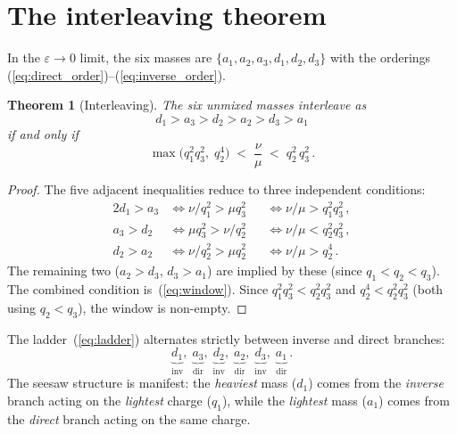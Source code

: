 \documentclass[preprint,12pt]{elsarticle}
\newtheorem{theorem}{Theorem}
\begin{document}
\section{The interleaving theorem}
\label{sec:interleaving}

In the $\varepsilon \to 0$ limit, the six masses are
$\{a_1, a_2, a_3, d_1, d_2, d_3\}$ with the orderings
(\ref{eq:direct_order})--(\ref{eq:inverse_order}).

\begin{theorem}[Interleaving]
The six unmixed masses interleave as
\begin{equation}
  d_1 > a_3 > d_2 > a_2 > d_3 > a_1
  \label{eq:ladder}
\end{equation}
if and only if
\begin{equation}
  \max\!\bigl(q_1^2 q_3^2,\; q_2^4\bigr)
  \;<\; \frac{\nu}{\mu}
  \;<\; q_2^2\,q_3^2\,.
  \label{eq:window}
\end{equation}
\end{theorem}

\begin{proof}
The five adjacent inequalities reduce to three independent conditions:
\begin{alignat}{2}
  d_1 > a_3 &\iff \nu/q_1^2 > \mu q_3^2
  &&\iff \nu/\mu > q_1^2 q_3^2\,,\\
  a_3 > d_2 &\iff \mu q_3^2 > \nu/q_2^2
  &&\iff \nu/\mu < q_2^2 q_3^2\,,\\
  d_2 > a_2 &\iff \nu/q_2^2 > \mu q_2^2
  &&\iff \nu/\mu > q_2^4\,.
\end{alignat}
The remaining two ($a_2 > d_3$, $d_3 > a_1$) are implied by
these (since $q_1 < q_2 < q_3$).
The combined condition is~(\ref{eq:window}).
Since $q_1^2 q_3^2 < q_2^2 q_3^2$ and $q_2^4 < q_2^2 q_3^2$
(both using $q_2 < q_3$), the window is non-empty.
\end{proof}

The ladder~(\ref{eq:ladder}) alternates strictly between
inverse and direct branches:
\begin{equation}
  \underbrace{d_1}_{\text{inv}},\;
  \underbrace{a_3}_{\text{dir}},\;
  \underbrace{d_2}_{\text{inv}},\;
  \underbrace{a_2}_{\text{dir}},\;
  \underbrace{d_3}_{\text{inv}},\;
  \underbrace{a_1}_{\text{dir}}\,.
  \label{eq:alternating}
\end{equation}
The seesaw structure is manifest: the \emph{heaviest}
mass ($d_1$) comes from the \emph{inverse} branch acting on the
\emph{lightest} charge ($q_1$), while the \emph{lightest}
mass ($a_1$) comes from the \emph{direct} branch acting on
the same charge.
\end{document}
